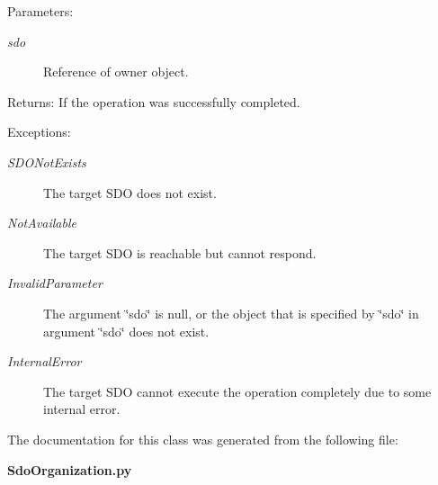 \begin{Desc}
\item[Parameters:]
\begin{description}
\item[{\em sdo}]Reference of owner object. \end{description}
\end{Desc}
\begin{Desc}
\item[Returns:]If the operation was successfully completed. \end{Desc}
\begin{Desc}
\item[Exceptions:]
\begin{description}
\item[{\em SDONot\-Exists}]The target SDO does not exist. \item[{\em Not\-Available}]The target SDO is reachable but cannot respond. \item[{\em Invalid\-Parameter}]The argument \char`\"{}sdo\char`\"{} is null, or the object that is specified by \char`\"{}sdo\char`\"{} in argument \char`\"{}sdo\char`\"{} does not exist. \item[{\em Internal\-Error}]The target SDO cannot execute the operation completely due to some internal error.\end{description}
\end{Desc}


The documentation for this class was generated from the following file:\begin{CompactItemize}
\item 
{\bf Sdo\-Organization.py}\end{CompactItemize}
